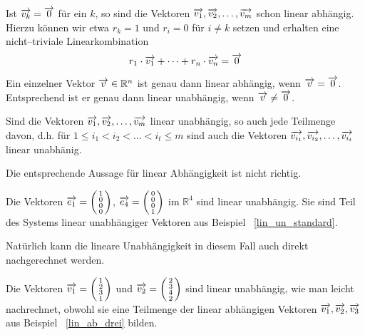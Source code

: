 \begin{notiz} Ist $\overrightarrow{v_k} = \overrightarrow{0}$ für ein $k$, so sind die 
Vektoren $\overrightarrow{v_1}, \overrightarrow{v_2}, \ldots, \overrightarrow{v_m}$ 
schon linear abhängig. Hierzu können wir etwa $r_k = 1$ und $r_i = 0$ für $i \neq k$ setzen 
und erhalten eine nicht--triviale Linearkombination
  	$$  r_1 \cdot \overrightarrow{v_1} + \cdots + r_n \cdot  \overrightarrow{v_n} =  \overrightarrow{0} $$
\end{notiz}

\begin{notiz}
Ein einzelner Vektor $\overrightarrow{v} \in \mathbb R^n$ ist genau dann linear abhängig, wenn $\overrightarrow{v} = \overrightarrow{0}$. 
Entsprechend ist er genau dann linear unabhängig, wenn $\overrightarrow{v} \neq \overrightarrow{0}$.
\end{notiz}

\begin{notiz} Sind die Vektoren $\overrightarrow{v_1}, \overrightarrow{v_2}, \ldots, \overrightarrow{v_m}$ 
linear unabhängig, so auch jede Teilmenge davon, d.h. für $1 \leq i_1 < i_2 < \ldots < i_t \leq m$ 
sind auch die Vektoren 
$\overrightarrow{v_{i_1}}, \overrightarrow{v_{i_2}}, \ldots, \overrightarrow{v_{i_t}}$ linear unabhänig.

Die entsprechende Aussage für linear Abhängigkeit ist nicht richtig.
\end{notiz}

\begin{beispiel} Die Vektoren  $\overrightarrow{e_1} = \left( \begin{smallmatrix} 1 \\ 0 \\ 0 \\ 0
\end{smallmatrix} \right)$, $\overrightarrow{e_4} = \left( \begin{smallmatrix} 0 \\ 0 \\ 0 \\ 1 
\end{smallmatrix} \right)$ im $\mathbb R^4$ sind linear unabhängig. Sie sind Teil des Systems linear 
unabhängiger Vektoren aus Beispiel ~\ref{lin_un_standard}.

Natürlich kann die lineare Unabhängigkeit in diesem Fall auch direkt nachgerechnet werden.
\end{beispiel}

\begin{beispiel} Die Vektoren  $\overrightarrow{v_1} = \left( \begin{smallmatrix} 1 \\ 2 \\ 3 \\ 1
\end{smallmatrix} \right)$ und  $\overrightarrow{v_2} = \left( \begin{smallmatrix} 2 \\ 3 \\ 4 \\ 2 
\end{smallmatrix} \right)$ sind linear unabhängig, wie man leicht nachrechnet, obwohl sie eine Teilmenge der 
linear abhängigen Vektoren $\overrightarrow{v_1}, \overrightarrow{v_2}, \overrightarrow{v_3}$ aus Beispiel
~\ref{lin_ab_drei} bilden.   
\end{beispiel}

